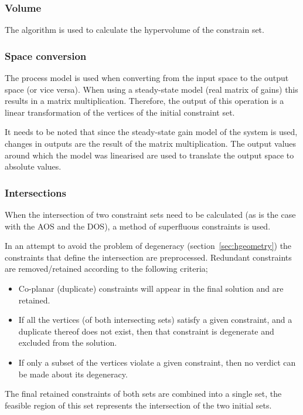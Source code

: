 \subsubsection{Volume}
The \qhull algorithm is used to calculate the hypervolume of the constrain set.

\subsubsection{Space conversion}
The process model is used when converting from the input space to the output space (or vice versa).
When using a steady-state model (real matrix of gains) this results in a matrix multiplication.
Therefore, the output of this operation is a linear transformation of the vertices of the initial constraint set.

It needs to be noted that since the steady-state gain model of the system is used, changes in outputs are the result of the matrix multiplication.
The output values around which the model was linearised are used to translate the output space to absolute values.  

\subsubsection{Intersections}
When the intersection of two constraint sets need to be calculated (as is the case with the AOS and the DOS), a method of superfluous constraints is used.

In an attempt to avoid the problem of degeneracy (section~\ref{sec:hgeometry}) the constraints that define the intersection are preprocessed.
Redundant constraints are removed/retained according to the following criteria;
\begin{itemize}
\item Co-planar (duplicate) constraints will appear in the final solution and are retained.
\item If all the vertices (of both intersecting sets) satisfy a given constraint, and a duplicate thereof does not exist, then that constraint is degenerate and excluded from the solution.
\item If only a subset of the vertices violate a given constraint, then no verdict can be made about its degeneracy.
\end{itemize}
The final retained constraints of both sets are combined into a single set, the feasible region of this set represents the intersection of the two initial sets.


